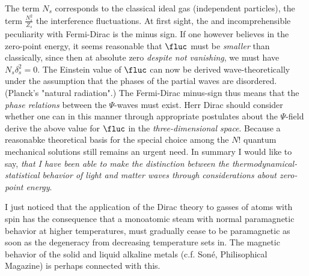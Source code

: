 The term $N_s$ corresponds to the classical ideal gas (independent particles), the term $\frac{N_s^2}{Z_s}$ the interference fluctuations. At first sight, the  and incomprehensible peculiarity with Fermi-Dirac is the minus sign. If one however believes in the zero-point energy, it seems reasonable that $\fluc$ must be \textit{smaller} than classically, since then at absolute zero \textit{despite not vanishing}, we must have $N_s\delta_s^2=0$. The Einstein value of $\fluc$ can now be derived wave-theoretically under the assumption that the phases of the partial waves are disordered. (Planck's "natural radiation".) The Fermi-Dirac minus-sign thus means that the \textit{phase relations} between the $\Psi$-waves must exist. Herr Dirac should consider whether one can in this manner through appropriate postulates about the $\Psi$-field derive the above value for $\fluc$ in the \textit{three-dimensional space}. Because a reasonabke theoretical basis for the special choice among the $N!$ quantum mechanical solutions still remains an urgent need. In summary I would like to say, \textit{that I have been able to make the distinction between the thermodynamical-statistical behavior of light and matter waves  through considerations about zero-point energy}.

I just noticed that the application of the Dirac theory to gasses of atoms with spin has the consequence that a monoatomic steam with normal paramagnetic behavior at higher temperatures, must gradually cease to be paramagnetic as soon as the degeneracy from decreasing temperature sets in. The magnetic behavior of the solid and liquid alkaline metals (c.f. Soné, Philisophical Magazine) is perhaps connected with this.

